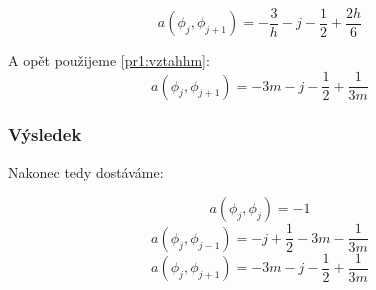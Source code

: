\documentclass[../main.tex]{subfiles}
\begin{document}
\begin{equation}
    a(\phi_j, \phi_{j+1}) = - \frac{3}{h} - j - \frac{1}{2} + \frac{2h}{6} 
\end{equation}


A opět použijeme \eqref{pr1:vztahhm}:
\begin{equation}
    a(\phi_j, \phi_{j+1}) = - 3m - j - \frac{1}{2} + \frac{1}{3m} 
\end{equation}

\subsubsection{Výsledek}
Nakonec tedy dostáváme:

\begin{equation}
    a(\phi_j, \phi_j) = -1
\end{equation}
\begin{equation}
    a(\phi_j, \phi_{j-1}) = -j + \frac{1}{2} -3m -\frac{1}{3m}
\end{equation}
\begin{equation}
    a(\phi_j, \phi_{j+1}) = - 3m - j - \frac{1}{2} + \frac{1}{3m} 
\end{equation}
\end{document}
